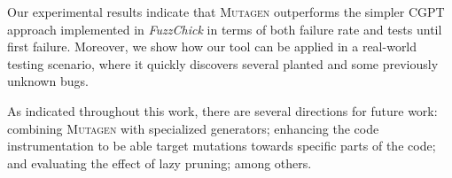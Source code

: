 \documentclass[sigconf, anonymous, review]{acmart}
\newcommand{\fuzzchick}{\textit{FuzzChick}\xspace}
\newcommand{\mutagen}{\textsc{Mutagen}\xspace}
\begin{document}
Our experimental results indicate that \mutagen outperforms the simpler CGPT
approach implemented in \fuzzchick in terms of both failure rate and tests until
first failure.
%
Moreover, we show how our tool can be applied in a real-world testing scenario,
where it quickly discovers several planted and some previously unknown bugs.


As indicated throughout this work, there are several directions for future work:
%
combining \mutagen with specialized generators; enhancing the code
instrumentation to be able target mutations towards specific parts of the code;
and evaluating the effect of lazy pruning; among others.






\balance





\end{document}

